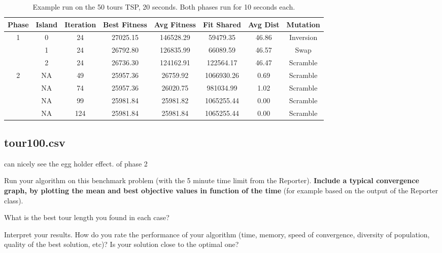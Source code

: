 \documentclass[a4paper,10pt]{article}
\newcommand{\ReplaceMe}[1]{{\color{blue}#1}}
\begin{document}
	
		
	\begin{table}[ht]
		\centering
		\begin{tabular}{|c|c|c|c|c|c|c|c|}
			\hline
			\textbf{Phase} & \textbf{Island} & \textbf{Iteration} & \textbf{Best Fitness} & \textbf{Avg Fitness} & \textbf{Fit Shared} & \textbf{Avg Dist} & \textbf{Mutation} \\
			\hline
			\multirow{3}{*}{1} & 0 & 24 & 27025.15 & 146528.29 & 59479.35 & 46.86 & Inversion\\
			& 1 & 24 & 26792.80 & 126835.99 & 66089.59 & 46.57 & Swap \\
			& 2 & 24 & 26736.30 & 124162.91 & 122564.17 & 46.47 & Scramble\\
			\hline
			\multirow{4}{*}{2} & NA & 49 & 25957.36 & 26759.92 & 1066930.26 & 0.69 & Scramble\\
			& NA & 74 & 25957.36 & 26020.75 & 981034.99 & 1.02 & Scramble \\
			& NA & 99 & 25981.84 & 25981.82 & 1065255.44 & 0.00 & Scramble\\
			& NA & 124 & 25981.84 & 25981.84 & 1065255.44 & 0.00 & Scramble\\
			\hline
		\end{tabular}
		\caption{Example run on the 50 tours TSP, 20 seconds. Both phases run for 10 seconds each.}
		\label{tbl:convergence}
	\end{table}
	
	




\subsection{tour100.csv}\label{sec_shorttour}

can nicely see the egg holder effect. of phase 2

\ReplaceMe{Run your algorithm on this benchmark problem (with the 5 minute time limit from the Reporter). \textbf{Include a typical convergence graph, by plotting the mean and best objective values in function of the time} (for example based on the output of the Reporter class).

What is the best tour length you found in each case? 

Interpret your results. How do you rate the performance of your algorithm (time, memory, speed of convergence, diversity of population, quality of the best solution, etc)? Is your solution close to the optimal one?}
\end{document}
